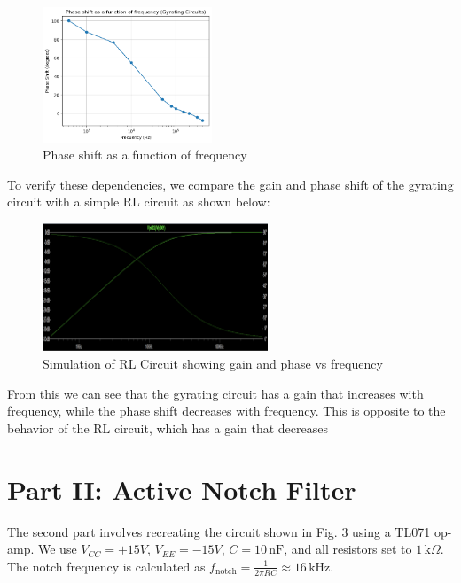 \documentclass{article}
\begin{document}
\begin{figure}[H]
    \centering
    \includegraphics[width=0.45\textwidth]{img/Lab 9/1_3.png} %
    \caption{Phase shift as a function of frequency}
    \label{fig:phase}
\end{figure}

To verify these dependencies, we compare the gain and phase shift of the 
gyrating circuit with a simple RL circuit as shown below:

\begin{figure}[H]
    \centering
    \includegraphics[width=0.6\textwidth]{img/Lab 9/1_6.png} %
    \caption{Simulation of RL Circuit showing gain and phase vs frequency}
\end{figure}

From this we can see that the gyrating circuit has a gain that increases
with frequency, while the phase shift decreases with frequency. This is
opposite to the behavior of the RL circuit, which has a gain that decreases


\section*{Part II: Active Notch Filter}
The second part involves recreating the circuit shown in Fig. 3 using a TL071 
op-amp. We use \( V_{CC} = +15V \), \( V_{EE} = -15V \), \( C = 10\,\text{nF} \), 
and all resistors set to \( 1\,\text{k}\Omega \). The notch frequency is 
calculated as \( f_{\text{notch}} = \frac{1}{2\pi RC} \approx 16\,\text{kHz} \).
\end{document}
